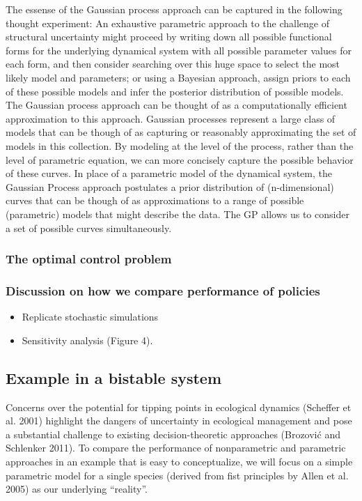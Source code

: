 \documentclass[author-year, review]{elsarticle} %
\begin{document}
The essense of the Gaussian process approach can be captured in the
following thought experiment: An exhaustive parametric approach to the
challenge of structural uncertainty might proceed by writing down all
possible functional forms for the underlying dynamical system with all
possible parameter values for each form, and then consider searching
over this huge space to select the most likely model and parameters; or
using a Bayesian approach, assign priors to each of these possible
models and infer the posterior distribution of possible models. The
Gaussian process approach can be thought of as a computationally
efficient approximation to this approach. Gaussian processes represent a
large class of models that can be though of as capturing or reasonably
approximating the set of models in this collection. By modeling at the
level of the process, rather than the level of parametric equation, we
can more concisely capture the possible behavior of these curves. In
place of a parametric model of the dynamical system, the Gaussian
Process approach postulates a prior distribution of (n-dimensional)
curves that can be though of as approximations to a range of possible
(parametric) models that might describe the data. The GP allows us to
consider a set of possible curves simultaneously.\\

\subsubsection{The optimal control problem}

\subsubsection{Discussion on how we compare performance of policies}

\begin{itemize}
\itemsep1pt\parskip0pt
\item
  Replicate stochastic simulations
\item
  Sensitivity analysis (Figure 4).
\end{itemize}

\subsection{Example in a bistable system}

Concerns over the potential for tipping points in ecological dynamics
(Scheffer et al. 2001) highlight the dangers of uncertainty in
ecological management and pose a substantial challenge to existing
decision-theoretic approaches (Brozović and Schlenker 2011). To compare
the performance of nonparametric and parametric approaches in an example
that is easy to conceptualize, we will focus on a simple parametric
model for a single species (derived from fist principles by Allen et al.
2005) as our underlying ``reality''.
\end{document}
